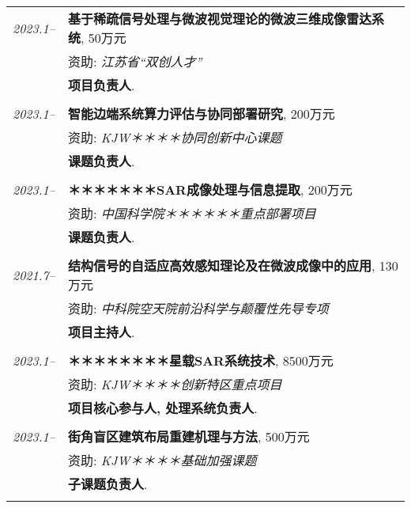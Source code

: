 \documentclass[paper=a4,fontsize=11pt]{scrartcl}
\begin{document}
\begin{longtable}{r|p{12cm}}
	\emph{2023.1--} & \textbf{基于稀疏信号处理与微波视觉理论的微波三维成像雷达系统}, 50万元 \\
	& 资助: \emph{江苏省``双创人才''}\\
	& \textbf{项目负责人}.\\
	\multicolumn{2}{c}{} \\
	
	\emph{2023.1--} & \textbf{智能边端系统算力评估与协同部署研究}, 200万元 \\
	& 资助: \emph{KJW＊＊＊＊协同创新中心课题}\\
	& \textbf{课题负责人}.\\
	\multicolumn{2}{c}{} \\
	
	\emph{2023.1--} & \textbf{＊＊＊＊＊＊＊SAR成像处理与信息提取}, 200万元 \\
	& 资助: \emph{中国科学院＊＊＊＊＊＊重点部署项目}\\
	& \textbf{课题负责人}.\\
	\multicolumn{2}{c}{} \\
	
	\emph{2021.7--} & \textbf{结构信号的自适应高效感知理论及在微波成像中的应用}, 130万元 \\
	& 资助: \emph{中科院空天院前沿科学与颠覆性先导专项}\\
	& \textbf{项目主持人}.\\
	\multicolumn{2}{c}{} \\
	
	\emph{2023.1--} & \textbf{＊＊＊＊＊＊＊＊星载SAR系统技术}, 8500万元 \\
	& 资助: \emph{KJW＊＊＊＊创新特区重点项目}\\
	& \textbf{项目核心参与人, 处理系统负责人}.\\
	\multicolumn{2}{c}{} \\
	
	\emph{2023.1--} & \textbf{街角盲区建筑布局重建机理与方法}, 500万元 \\
	& 资助: \emph{KJW＊＊＊＊基础加强课题}\\
	& \textbf{子课题负责人}.\\
	\multicolumn{2}{c}{} \\
	

\end{longtable}
\end{document}
